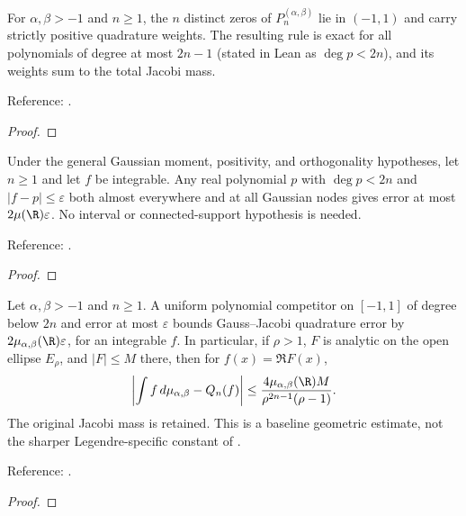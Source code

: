 \begin{theorem}
\label{thm:quadrature}
\leanok
For $\alpha,\beta>-1$ and $n\ge1$, the $n$ distinct zeros of
$P_n^{(\alpha,\beta)}$ lie in $(-1,1)$ and carry strictly positive quadrature
weights. The resulting rule is exact for all polynomials of degree at most
$2n-1$ (stated in Lean as $\deg p<2n$), and its weights sum to the total Jacobi
mass.

Reference: \cite[3.5(v)]{dlmf}.
\end{theorem}
\begin{proof}
\leanok
\end{proof}

\begin{theorem}
\label{thm:general-gauss-error}
\leanok
Under the general Gaussian moment, positivity, and orthogonality hypotheses,
let $n\ge1$ and let $f$ be integrable. Any real polynomial $p$ with
$\deg p<2n$ and $|f-p|\le\varepsilon$ both almost everywhere and at all
Gaussian nodes gives error at most $2\mu(\R)\varepsilon$.
No interval or connected-support hypothesis is needed.

Reference: \cite[proof of Theorem 19.3]{atap}.
\end{theorem}
\begin{proof}
\leanok
\end{proof}

\begin{theorem}
\label{thm:jacobi-gauss-geometric-error}
\leanok
Let $\alpha,\beta>-1$ and $n\ge1$. A uniform polynomial competitor on $[-1,1]$
of degree below $2n$ and error at most $\varepsilon$ bounds Gauss--Jacobi
quadrature error by $2\mu_{\alpha,\beta}(\R)\varepsilon$, for an integrable $f$.
In particular, if $\rho>1$, $F$ is analytic on the open ellipse $E_\rho$,
and $|F|\le M$ there, then for $f(x)=\Re F(x)$,
\[
 \left|\int f\,d\mu_{\alpha,\beta}-Q_n(f)\right|
 \le\frac{4\mu_{\alpha,\beta}(\R)M}{\rho^{2n-1}(\rho-1)}.
\]
The original Jacobi mass is retained. This is a baseline geometric estimate,
not the sharper Legendre-specific constant of \cite[Theorem 19.3]{atap}.

Reference: \cite[proof of Theorem 19.3]{atap}.
\end{theorem}
\begin{proof}
\leanok
\end{proof}

